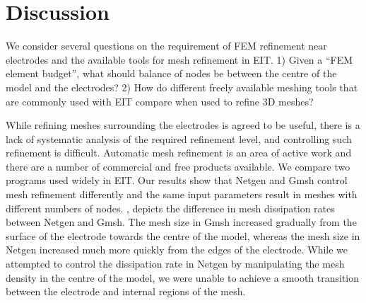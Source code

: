   
%  
%  
  
\section{Discussion}

We consider several questions on the requirement of FEM refinement near
electrodes and the available tools for mesh refinement in EIT. 
1) Given a ``FEM element budget'', what should
balance of nodes be between the centre of the model and the electrodes?
2) How do different freely available meshing tools that are
commonly used with EIT compare when used to refine 3D meshes?

While refining meshes surrounding the electrodes  is agreed to be useful,
there is a lack of systematic analysis of
the required refinement level, and controlling such
refinement is difficult. Automatic mesh refinement is an area of active work and there are
a number of commercial and free products available. We compare two programs 
used widely in EIT.
Our results show that Netgen and Gmsh control mesh refinement differently 
and the same input parameters result in meshes with different numbers of nodes. 
, depicts the difference in
mesh dissipation rates between Netgen and Gmsh. The mesh size in Gmsh increased
gradually from the surface of the electrode  towards the centre of the model,
whereas the mesh size in Netgen increased much more quickly from the edges of the
electrode. While we attempted to control the dissipation rate in 
Netgen by manipulating the mesh density in the centre of the model, we were unable 
to achieve a smooth transition between the electrode and internal regions of the mesh. 

